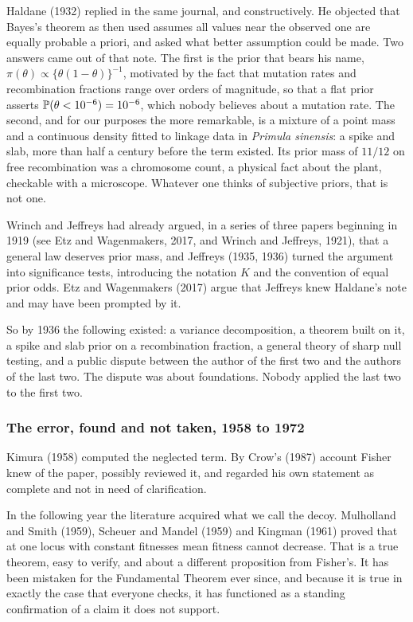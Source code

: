 Haldane (1932) replied in the same journal, and constructively. He objected that Bayes's theorem as
then used assumes all values near the observed one are equally probable a priori, and asked what
better assumption could be made. Two answers came out of that note. The first is the prior that
bears his name, $\pi(\theta)\propto\{\theta(1-\theta)\}^{-1}$, motivated by the fact that mutation
rates and recombination fractions range over orders of magnitude, so that a flat prior asserts
$\mathbb{P}(\theta<10^{-6})=10^{-6}$, which nobody believes about a mutation rate. The second, and for
our purposes the more remarkable, is a mixture of a point mass and a continuous density fitted to
linkage data in \emph{Primula sinensis}: a spike and slab, more than half a century before the term
existed. Its prior mass of $11/12$ on free recombination was a chromosome count, a physical fact
about the plant, checkable with a microscope. Whatever one thinks of subjective priors, that is not
one.

Wrinch and Jeffreys had already argued, in a series of three papers beginning in 1919 (see Etz and
Wagenmakers, 2017, and Wrinch and Jeffreys, 1921), that a general law deserves prior mass, and
Jeffreys (1935, 1936) turned the argument into significance tests, introducing the notation $K$ and
the convention of equal prior odds. Etz and Wagenmakers (2017) argue that Jeffreys knew Haldane's
note and may have been prompted by it.

So by 1936 the following existed: a variance decomposition, a theorem built on it, a spike and slab
prior on a recombination fraction, a general theory of sharp null testing, and a public dispute
between the author of the first two and the authors of the last two. The dispute was about
foundations. Nobody applied the last two to the first two.

\subsubsection{The error, found and not taken, 1958 to 1972}

Kimura (1958) computed the neglected term. By Crow's (1987) account Fisher knew of the paper,
possibly reviewed it, and regarded his own statement as complete and not in need of clarification.

In the following year the literature acquired what we call the decoy. Mulholland and Smith (1959),
Scheuer and Mandel (1959) and Kingman (1961) proved that at one locus with constant fitnesses mean
fitness cannot decrease. That is a true theorem, easy to verify, and about a different proposition
from Fisher's. It has been mistaken for the Fundamental Theorem ever since, and because it is true
in exactly the case that everyone checks, it has functioned as a standing confirmation of a claim
it does not support.

